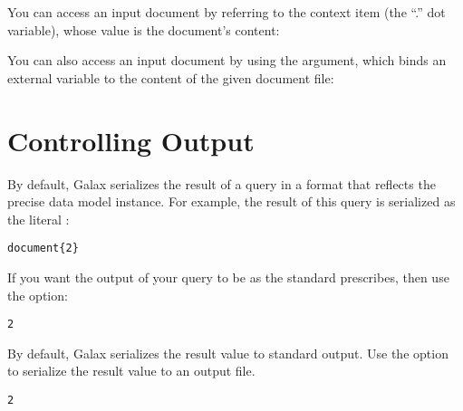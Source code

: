 You can access an input document by referring to the context item (the
``.'' dot variable), whose value is the document's content:
\begin{alltt}
% echo '.' >dot.xq
% glx xquery -context-item docs/books.xml dot.xq
\end{alltt}

You can also access an input document by using the 
argument, which binds an external variable to the content of the given
document file:
\begin{alltt}
% echo 'declare variable $x external; $x' > var.xq
% glx xquery -doc x=docs/books.xml var.xq
\end{alltt}

\section{Controlling Output}

By default, Galax serializes the result of a query in a format that
reflects the precise data model instance. For example, the result of
this query is serialized as the literal :
\begin{alltt}
% echo "document \{ 1+1 \}"> docnode.xq
% glx xquery docnode.xq
document \{ 2 \}
\end{alltt}

If you want the output of your query to be as the standard prescribes, 
then use the  option:
\begin{alltt}
% glx xquery docnode.xq -serialize standard
2
\end{alltt}


By default, Galax serializes the result value to standard output.  Use
the  option to serialize the result value to an output
file.
\begin{alltt}
% glx xquery docnode.xq -serialize standard -output-xml output.xml
% cat output.xml
2
\end{alltt}

